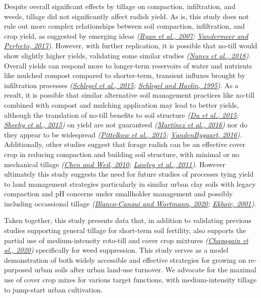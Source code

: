 \documentclass[
  12pt,
]{article}
\begin{document}
Despite overall significant effects by tillage on compaction, infiltration, and weeds, tillage did not significantly affect radish yield.
As is, this study does not rule out more complex relationships between soil compaction, infiltration, and crop yield, as suggested by emerging ideas \emph{(\protect\hyperlink{ref-ryan07}{Ryan et al., 2007}; \protect\hyperlink{ref-vandermeer17}{Vandermeer and Perfecto, 2017})}.
However, with further replication, it is possible that no-till would show slightly higher yields, validating some similar studies \emph{(\protect\hyperlink{ref-nunes18}{Nunes et al., 2018})}.
Overall yields can respond more to longer-term reservoirs of water and nutrients like mulched compost compared to shorter-term, transient influxes brought by infiltration processes \emph{(\protect\hyperlink{ref-schlegel15}{Schlegel et al., 2015}; \protect\hyperlink{ref-schlegel95}{Schlegel and Havlin, 1995})}.
As a result, it is possible that similar alternative soil management practices like no-till combined with compost and mulching application may lead to better yields, although the translation of no-till benefits to soil structure \emph{(\protect\hyperlink{ref-du15}{Du et al., 2015}; \protect\hyperlink{ref-sheehy15}{Sheehy et al., 2015})} on yield are not guaranteed \emph{(\protect\hyperlink{ref-martinez16}{Martínez et al., 2016})} nor do they appear to be widespread \emph{(\protect\hyperlink{ref-pittelkow15}{Pittelkow et al., 2015}; \protect\hyperlink{ref-vandenbygaart16}{VandenBygaart, 2016})}.
Additionally, other studies suggest that forage radish can be an effective cover crop in reducing compaction and building soil structure, with minimal or no mechanical tillage \emph{(\protect\hyperlink{ref-chen10b}{Chen and Weil, 2010}; \protect\hyperlink{ref-lawley11}{Lawley et al., 2011})}.
However ultimately this study suggests the need for future studies of processes tying yield to land management strategies particularly in similar urban clay soils with legacy compaction and pH concerns under smallholder management and possibly including occassional tillage \emph{(\protect\hyperlink{ref-blanco-canqui20}{Blanco-Canqui and Wortmann, 2020}; \protect\hyperlink{ref-ekboir01}{Ekboir, 2001})}.

Taken together, this study presents data that, in addition to validating previous studies supporting general tillage for short-term soil fertility, also supports the partial use of medium-intensity roto-till and cover crop mixtures \emph{(\protect\hyperlink{ref-chapagain20}{Chapagain et al., 2020})} specifically for weed suppression.
This study serves as a model demonstration of both widely accessible and effective strategies for growing on re-purposed urban soils after urban land-use turnover.
We advocate for the maximal use of cover crop mixes for various target functions, with medium-intensity tillage to jump-start urban cultivation.
\end{document}
